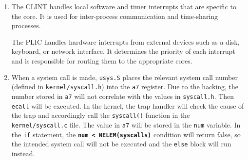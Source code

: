 \documentclass{hw}
\begin{document}
\begin{enumerate}[itemsep=.4cm]
\item 
The CLINT handles local software and timer interrupts that are specific to the core. It is used for inter-process communication and time-sharing processes.

The PLIC handles hardware interrupts from external devices such as a disk, keyboard, or network interface. It determines the priority of each interrupt and is responsible for routing them to the appropriate cores. 

\item When a system call is made, \texttt{usys.S} places the relevant system call number (defined in \texttt{kernel/syscall.h}) into the \texttt{a7} register. Due to the hacking, the number stored in \texttt{a7} will not correlate with the values in \texttt{syscall.h}. Then \texttt{ecall} will be executed. In the kernel, the trap handler will check the cause of the trap and accordingly call the \texttt{syscall()} function in the \texttt{kernel/syscall.c} file. The value in \texttt{a7} will be stored in the \texttt{num} variable. In the \texttt{if} statement, the \texttt{\textbf{num < NELEM(syscalls)}} condition will return false, so the intended system call will not be executed and the \texttt{else} block will run instead. 

\end{enumerate}
\end{document}

